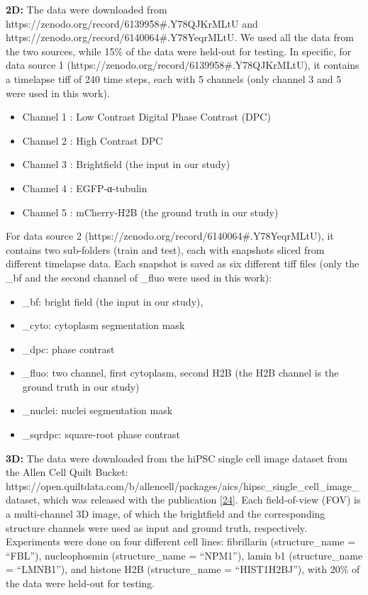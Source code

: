 \textbf{2D:} The data were downloaded from https://zenodo.org/record/6139958\#.Y78QJKrMLtU and https://zenodo.org/record/6140064\#.Y78YeqrMLtU. We used all the data from the two sources, while 15\% of the data were held-out for testing. In specific, for data source 1 (https://zenodo.org/record/6139958\#.Y78QJKrMLtU), it contains a timelapse tiff of 240 time steps, each with 5 channels (only channel 3 and 5 were used in this work).

\begin{itemize}
\tightlist
\item
  Channel 1 : Low Contrast Digital Phase Contrast (DPC)
\item
  Channel 2 : High Contrast DPC
\item
  Channel 3 : Brightfield (the input in our study)
\item
  Channel 4 : EGFP-α-tubulin
\item
  Channel 5 : mCherry-H2B (the ground truth in our study)
\end{itemize}

For data source 2 (https://zenodo.org/record/6140064\#.Y78YeqrMLtU), it contains two sub-folders (train and test), each with snapshots sliced from different timelapse data. Each snapshot is saved as six different tiff files (only the \_bf and the second channel of \_fluo were used in this work):

\begin{itemize}
\tightlist
\item
  \_bf: bright field (the input in our study),
\item
  \_cyto: cytoplasm segmentation mask
\item
  \_dpc: phase contrast
\item
  \_fluo: two channel, first cytoplasm, second H2B (the H2B channel is the ground truth in our study)
\item
  \_nuclei: nuclei segmentation mask
\item
  \_sqrdpc: square-root phase contrast
\end{itemize}

\textbf{3D:} The data were downloaded from the hiPSC single cell image dataset from the Allen Cell Quilt Bucket: https://open.quiltdata.com/b/allencell/packages/aics/hipsc\_single\_cell\_image\_dataset, which was released with the publication {[}\protect\hyperlink{ref-5sGcmDuy}{24}{]}. Each field-of-view (FOV) is a multi-channel 3D image, of which the brightfield and the corresponding structure channels were used as input and ground truth, respectively. Experiments were done on four different cell lines: fibrillarin (structure\_name = ``FBL''), nucleophosmin (structure\_name = ``NPM1''), lamin b1 (structure\_name = ``LMNB1''), and histone H2B (structure\_name = ``HIST1H2BJ''), with 20\% of the data were held-out for testing.

